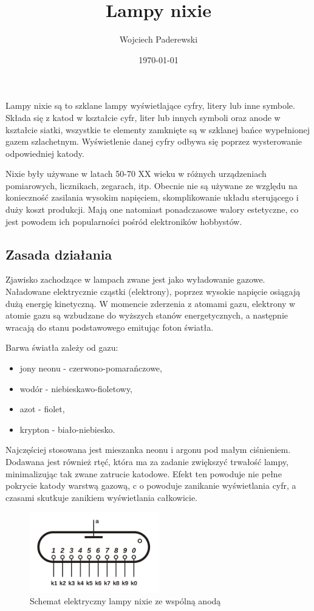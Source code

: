\documentclass[../main.tex]{subfiles}
\author{Wojciech Paderewski}
\date{\today}
\title{Lampy nixie}
\begin{document}
Lampy nixie są to szklane lampy wyświetlające cyfry, litery lub inne symbole.
Składa się z katod w kształcie cyfr, liter lub innych symboli oraz anode w kształcie siatki, wszystkie
te elementy zamknięte są w szklanej bańce wypełnionej gazem szlachetnym.
Wyświetlenie danej cyfry odbywa się poprzez wysterowanie odpowiedniej katody.

Nixie były używane w latach 50-70 XX wieku w różnych urządzeniach pomiarowych, licznikach, zegarach, itp. 
Obecnie nie są używane ze względu na konieczność zasilania wysokim napięciem, skomplikowanie układu sterującego i duży koszt produkcji.
Mają one natomiast ponadczasowe walory estetyczne, co jest powodem ich popularności pośród elektroników hobbystów.

\subsection{Zasada działania}
Zjawisko zachodzące w lampach zwane jest jako wyładowanie gazowe.\cite{st:nixie}
Naładowane elektrycznie cząstki (elektrony), poprzez wysokie napięcie osiągają dużą energię kinetyczną.
W momencie zderzenia z atomami gazu, elektrony w atomie gazu są wzbudzane do wyższych stanów energetycznych, a następnie wracają do stanu podstawowego emitując foton światła.

Barwa światła zależy od gazu:
\begin{itemize}
  \item jony neonu - czerwono-pomarańczowe,
  \item wodór - niebieskawo-fioletowy,
  \item azot - fiolet,
  \item krypton - biało-niebiesko.
\end{itemize}

Najczęściej stosowana jest mieszanka neonu i argonu pod małym ciśnieniem. Dodawana jest również rtęć, 
która ma za zadanie zwiększyć trwałość lampy, 
minimalizując tak zwane zatrucie katodowe. Efekt ten powoduje nie pełne pokrycie katody warstwą gazową, c
o powoduje zanikanie wyświetlania cyfr,
a czasami skutkuje zanikiem wyświetlania całkowicie.

\begin{figure}[H]
  \centering
  \includegraphics[width=0.5\textwidth]{Nixie_schematic.png}
  \caption{Schemat elektryczny lampy nixie ze wspólną anodą\cite{st:nixie-jpg}}
\end{figure}
\end{document}
